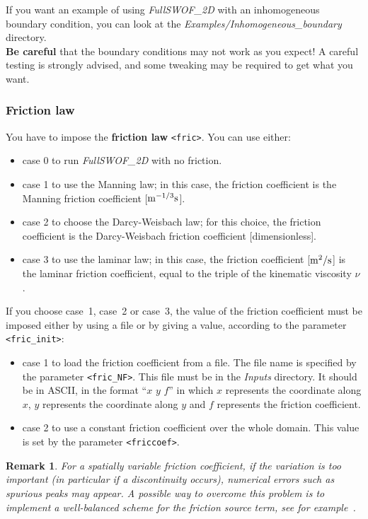 \documentclass[a4paper, 11pt]{article}
\newcommand{\FullSWOF}{\emph{FullSWOF\_2D}}
\newtheorem{rmk}{Remark}
\begin{document}
If you want an example of using \FullSWOF{} with an inhomogeneous boundary condition, you can look at the \textit{Examples/Inhomogeneous\_boundary} directory.\\

\textbf{Be careful} that the boundary conditions may not work as you expect! A careful testing is strongly advised, and some tweaking may be required to get what you want.

\subsubsection{Friction law}
You have to impose the \textbf{friction law} \texttt{<fric>}. You can use either:
\begin{itemize}
\item case 0 to run \FullSWOF{} with no friction.
\item case 1 to use the Manning law; in this case, the friction coefficient is the Manning friction coefficient [$\rm m^{-1/3}s$]. 
\item case 2 to choose the Darcy-Weisbach law; for this choice, the friction coefficient is the Darcy-Weisbach friction coefficient [dimensionless].
\item case 3 to use the laminar law; in this case, the friction coefficient [$\rm m^{2}/s$] is the laminar friction coefficient,
equal to the triple of the kinematic viscosity $\nu$.
\end{itemize}
If you choose case~1, case~2 or case~3, the value of the friction coefficient must be imposed either by using a file or by giving a value, according to the parameter \texttt{<fric\_init>}:
\begin{itemize}
\item case 1 to load the friction coefficient from a file. The file name is specified by the parameter \texttt{<fric\_NF>}. This file must be in the \textit{Inputs} directory. It should be in ASCII, in the format ``$x$ $y$ $f$'' in which $x$ represents the coordinate along $x$, $y$ represents the coordinate along $y$ and $f$ represents the friction coefficient.
\item case 2 to use a constant friction coefficient over the whole domain. This value is set by the parameter \texttt{<friccoef>}.
\end{itemize}
\begin{rmk}
For a spatially variable friction coefficient, if the variation is too important (in particular if a discontinuity occurs), 
numerical errors such as spurious peaks may appear. 
A possible way to overcome this problem is to implement a well-balanced scheme for the friction source term, see for example~\cite{Bouchut04}. 
\end{rmk}
\end{document}
